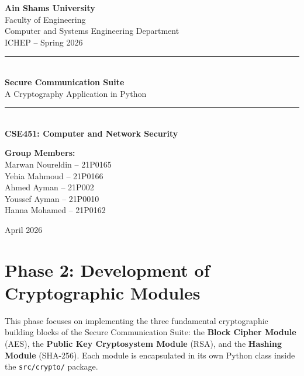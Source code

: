 \documentclass[12pt,a4paper]{article}
\newcommand{\HRule}{\rule{\linewidth}{0.5mm}}
\begin{document}
\begin{titlepage}
\centering
\vspace*{1cm}
{\large\textbf{Ain Shams University}}\\[0.3cm]
{\large Faculty of Engineering}\\[0.1cm]
{\large Computer and Systems Engineering Department}\\[0.1cm]
{\large ICHEP -- Spring 2026}\\[1.5cm]
\HRule\\[0.6cm]
{\Huge\bfseries Secure Communication Suite}\\[0.3cm]
{\Large A Cryptography Application in Python}\\[0.4cm]
\HRule\\[1.5cm]
{\large\textbf{CSE451: Computer and Network Security}}\\[2cm]

\begin{minipage}{0.5\textwidth}
\begin{flushleft}\large
\textbf{Group Members:}\\[0.3cm]
Marwan Noureldin – 21P0165\\
Yehia Mahmoud – 21P0166\\
Ahmed Ayman – 21P002\\
Youssef Ayman – 21P0010 \\
Hanna Mohamed – 21P0162\\
\end{flushleft}
\end{minipage}
\vfill
{\large April 2026}
\end{titlepage}

\tableofcontents
\newpage

\section{Phase 2: Development of Cryptographic Modules}

This phase focuses on implementing the three fundamental cryptographic building blocks of the Secure Communication Suite: the \textbf{Block Cipher Module} (AES), the \textbf{Public Key Cryptosystem Module} (RSA), and the \textbf{Hashing Module} (SHA-256). Each module is encapsulated in its own Python class inside the \texttt{src/crypto/} package.
\end{document}
